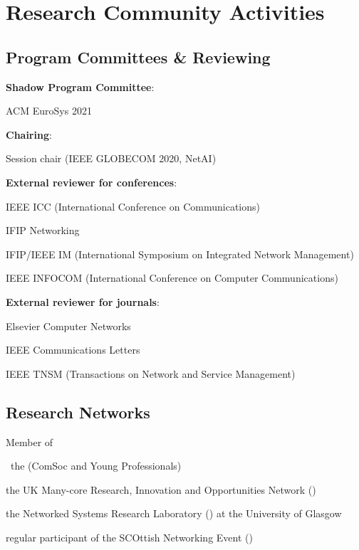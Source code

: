 \section{Research Community Activities}
\subsection{Program Committees \& Reviewing}
\begin{cvitemize}
	\item \textbf{Shadow Program Committee}:
	\begin{inlineItemize}
		\item ACM EuroSys 2021
	\end{inlineItemize}
	\item \textbf{Chairing}:
	\begin{inlineItemize}
		\item Session chair (IEEE GLOBECOM 2020, NetAI)
	\end{inlineItemize}
	\item \textbf{External reviewer for conferences}:
	\begin{inlineItemize}
		\item IEEE ICC (International Conference on Communications)
		\item IFIP Networking
		\item IFIP/IEEE IM (International Symposium on Integrated Network Management)
		\item IEEE INFOCOM (International Conference on Computer Communications)
	\end{inlineItemize}
	\item \textbf{External reviewer for journals}:
	\begin{inlineItemize}
		\item Elsevier Computer Networks
		\item IEEE Communications Letters
		\item IEEE TNSM (Transactions on Network and Service Management)
	\end{inlineItemize}
\end{cvitemize}

\subsection{Research Networks}
\begin{cvitemize}
	\item Member of
	\begin{inlineItemize}
		\item \ the  (ComSoc and Young Professionals)
		\item the UK Many-core Research, Innovation and Opportunities Network ()
		\item the Networked Systems Research Laboratory () at the University of Glasgow
		\item regular participant of the SCOttish Networking Event ()
	\end{inlineItemize}
\end{cvitemize}